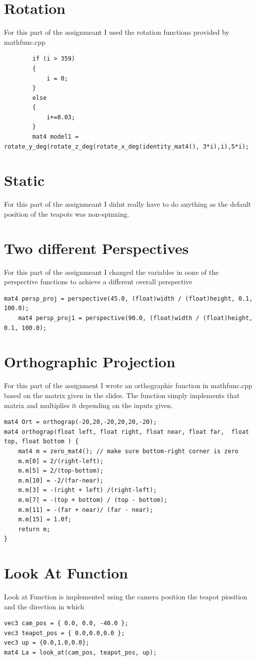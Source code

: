 \documentclass{article}
\begin{document}
\section{Rotation}
For this part of the assignmeant I used the rotation functions provided by mathfunc.cpp
\begin{lstlisting}
		if (i > 359)
		{
			i = 0;
		}
		else
		{
			i+=0.03;
		}
		mat4 model1 = rotate_y_deg(rotate_z_deg(rotate_x_deg(identity_mat4(), 3*i),i),5*i);
\end{lstlisting}

\section{Static}
For this part of the assignmeant I didnt really have to do anything as the default position of the teapots was non-spinning.


\section{Two different Perspectives}
For this part of the assignmeant I changed the variables in oone of the perspective functions to achieve a different overall perspective
\begin{lstlisting}
mat4 persp_proj = perspective(45.0, (float)width / (float)height, 0.1, 100.0);
	mat4 persp_proj1 = perspective(90.0, (float)width / (float)height, 0.1, 100.0);
\end{lstlisting}



\section{Orthographic Projection}
For this part of the assignment I wrote an orthographic function in mathfunc.cpp based on the matrix given in the slides. The function simply implements that matrix and multiplies it depending on the inputs given.

\begin{lstlisting}
mat4 Ort = orthograp(-20,20,-20,20,20,-20);
mat4 orthograp(float left, float right, float near, float far,  float top, float bottom ) {	
	mat4 m = zero_mat4(); // make sure bottom-right corner is zero
	m.m[0] = 2/(right-left);
	m.m[5] = 2/(top-bottom);
	m.m[10] = -2/(far-near);
	m.m[3] = -(right + left) /(right-left);
	m.m[7] = -(top + bottom) / (top - bottom);
	m.m[11] = -(far + near)/ (far - near);
	m.m[15] = 1.0f;
	return m;
}
\end{lstlisting}


\section{Look At Function}
Look at Function is implemented using the camera position the teapot piosition and the direction in which 
\begin{lstlisting}
vec3 cam_pos = { 0.0, 0.0, -40.0 };
vec3 teapot_pos = { 0.0,0.0,0.0 };
vec3 up = {0.0,1.0,0.0};
mat4 La = look_at(cam_pos, teapot_pos, up);


\end{lstlisting}
\pagebreak

	
\end{document}

